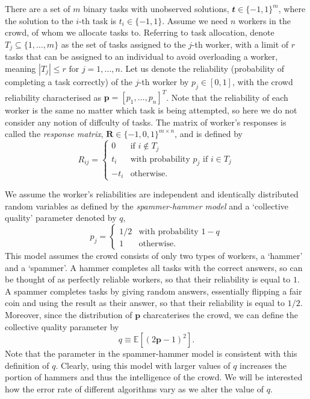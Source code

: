 \documentclass[12pt]{article}
\numberwithin{equation}{section}
\begin{document}
There are a set of $m$ binary tasks with unobserved solutions, $\mathbfit{t} \in \{-1,1\}^{m}$, where the solution to the $i$-th task is $t_{i} \in \{-1,1\}$. Assume we need $n$ workers in the crowd, of whom we allocate tasks to. Referring to task allocation, denote $T_{j} \subseteq \{1,\dots,m\}$ as the set of tasks assigned to the $j$-th worker, with a limit of $r$ tasks that can be assigned to an individual to avoid overloading a worker, meaning $\left\vert{T_{j}}\right\vert \le r \text{ for } j=1,\dots,n$. Let us denote the reliability (probability of completing a task correctly) of the $j$-th worker by $p_{j} \in [0,1]$, with the crowd reliability characterised as $\mathbf{p} = [p_{1},\dots,p_{n}]^{T}$. Note that the reliability of each worker is the same no matter which task is being attempted, so here we do not consider any notion of diffculty of tasks. The matrix of worker's responses is called the \textsl{response matrix}, $\mathbf{R} \in \{-1,0,1\}^{m \times n}$, and is defined by
\begin{equation*}
	R_{ij} =
	\begin{cases}
		0 & \text{if } i \not \in T_{j}\\
		t_{i} & \text{with probability }  p_{j} \text{ if } i \in T_{j}\\
		-t_{i} & \text{otherwise}.
	\end{cases}
\end{equation*}

We assume the worker's reliabilities are independent and identically distributed random variables as defined by the \textsl{spammer-hammer model} and a `collective quality' parameter denoted by $q$,
\begin{equation*}
	p_{j} =
	\begin{cases}
		1/2 & \text{with probability } 1-q\\
		1 & \text{otherwise}.
	\end{cases}
\end{equation*}
This model assumes the crowd consists of only two types of workers, a `hammer' and a `spammer'. A hammer completes all tasks with the correct answers, so can be thought of as perfectly reliable workers, so that their reliability is equal to $1$. A spammer completes tasks by giving random answers, essentially flipping a fair coin and using the result as their answer, so that their reliability is equal to $1/2$.  Moreover, since the distribution of $\mathbf{p}$ charcaterises the crowd, we can define the collective quality parameter by
\begin{equation*}
	q \equiv \mathbb{E}[(2\mathbf{p}-1)^{2}].
\end{equation*}
Note that the parameter in the spammer-hammer model is consistent with this definition of $q$.
Clearly, using this model with larger values of $q$ increases the portion of hammers and thus the intelligence of the crowd. We will be interested how the error rate of different algorithms vary as we alter the value of $q$.
\end{document}
